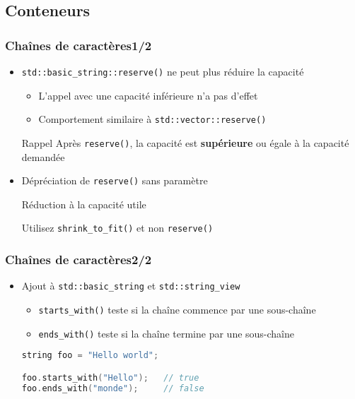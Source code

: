 \documentclass[C++.tex]{subfiles}
\begin{document}
\subsection*{Conteneurs}
\begin{frame}[fragile]
	\frametitle{Chaînes de caractères\titlehfill{}1/2}
	\begin{itemize}
		\item \lstinline|std::basic_string::reserve()| ne peut plus réduire la capacité
		\begin{itemize}
			\item L'appel avec une capacité inférieure n'a pas d'effet


			\item Comportement similaire à \lstinline|std::vector::reserve()|
		\end{itemize}

		\begin{block}{Rappel}
			Après \lstinline|reserve()|, la capacité est \textbf{supérieure} ou égale à la capacité demandée
		\end{block}

		\item Dépréciation de \lstinline|reserve()| sans paramètre

		\begin{block}{Réduction à la capacité utile}

			Utilisez \lstinline|shrink_to_fit()| et non \lstinline|reserve()|

		\end{block}
	\end{itemize}
\end{frame}


\begin{frame}[fragile]
	\frametitle{Chaînes de caractères\titlehfill{}2/2}
	\begin{itemize}
		\item Ajout à \lstinline|std::basic_string| et \lstinline|std::string_view|
		\begin{itemize}
			\item \lstinline|starts_with()| teste si la chaîne commence par une sous-chaîne
			\item \lstinline|ends_with()| teste si la chaîne termine par une sous-chaîne
		\end{itemize}

	\begin{lstlisting}[language=C++]
string foo = "Hello world";

foo.starts_with("Hello");   // true
foo.ends_with("monde");     // false\end{lstlisting}
	\end{itemize}
\end{frame}
\end{document}
